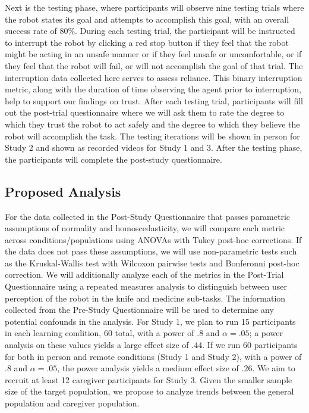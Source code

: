 \documentclass[letterpaper]{article} %
\begin{document}
Next is the testing phase, where participants will observe nine testing trials where the robot states its goal and attempts to accomplish this goal, with an overall success rate of 80\%. During each testing trial, the participant will be instructed to interrupt the robot by clicking a red stop button if they feel that the robot might be acting in an unsafe manner or if they feel unsafe or uncomfortable, or if they feel that the robot will fail, or will not accomplish the goal of that trial. The interruption data collected here serves to assess reliance. This binary interruption metric, along with the duration of time observing the agent prior to interruption, help to support our findings on trust. After each testing trial, participants will fill out the post-trial questionnaire where we will ask them to rate the degree to which they trust the robot to act safely and the degree to which they believe the robot will accomplish the task. The testing iterations will be shown in person for Study 2 and shown as recorded videos for Study 1 and 3. After the testing phase, the participants will complete the post-study questionnaire.

\vspace{-1.58mm}
\subsection{Proposed Analysis}
For the data collected in the Post-Study Questionnaire that passes parametric assumptions of normality and homoscedasticity, we will compare each metric across conditions/populations using ANOVAs with Tukey post-hoc corrections. If the data does not pass these assumptions, we will use non-parametric tests such as the Kruskal-Wallis test with Wilcoxon pairwise tests and Bonferonni post-hoc correction. We will additionally analyze each of the metrics in the Post-Trial Questionnaire using a repeated measures analysis to distinguish between user perception of the robot in the knife and medicine sub-tasks. The information collected from the Pre-Study Questionnaire will be used to determine any potential confounds in the analysis. For Study 1, we plan to run 15 participants in each learning condition, 60 total, with a power of $.8$ and $\alpha=.05$; a power analysis on these values yields a large effect size of $.44$. If we run 60 participants for both in person and remote conditions (Study 1 and Study 2), with a power of $.8$ and $\alpha=.05$, the power analysis yields a medium effect size of $.26$. We aim to recruit at least 12 caregiver participants for Study 3. Given the smaller sample size of the target population, we propose to analyze trends between the general population and caregiver population.
\end{document}
